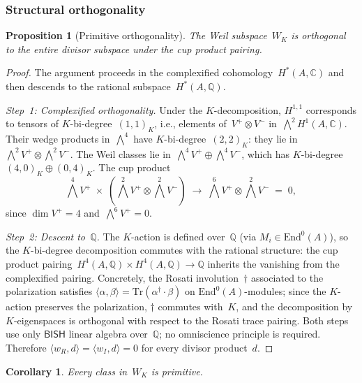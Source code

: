 \documentclass[11pt]{article}
\theoremstyle{plain}
\newtheorem{proposition}[theorem]{Proposition}
\newtheorem{corollary}[theorem]{Corollary}
\theoremstyle{definition}
\theoremstyle{remark}
\newcommand{\Q}{\mathbb{Q}}
\newcommand{\C}{\mathbb{C}}
\newcommand{\End}{\mathrm{End}}
\newcommand{\Tr}{\mathrm{Tr}}
\newcommand{\BISH}{\mathsf{BISH}}
\begin{document}
\subsubsection{Structural orthogonality}

\begin{proposition}[Primitive orthogonality]
\label{prop:orthogonal}
The Weil subspace~$W_K$ is orthogonal to the entire divisor subspace
under the cup product pairing.
\end{proposition}

\begin{proof}
The argument proceeds in the complexified cohomology~$H^*(A,\C)$ and then
descends to the rational subspace~$H^*(A,\Q)$.

\emph{Step~1: Complexified orthogonality.}
Under the $K$-decomposition, $H^{1,1}$ corresponds to tensors of
$K$-bi-degree~$(1,1)_K$, i.e., elements of~$V^+ \otimes V^-$
in~$\bigwedge^2 H^1(A,\C)$.  Their wedge products in~$\bigwedge^4$ have
$K$-bi-degree~$(2,2)_K$: they lie in
$\bigwedge^2 V^+ \otimes \bigwedge^2 V^-$.
The Weil classes lie in~$\bigwedge^4 V^+ \oplus \bigwedge^4 V^-$, which
has $K$-bi-degree~$(4,0)_K \oplus (0,4)_K$.  The cup product
\[
  \textstyle\bigwedge^4 V^+ \;\times\;
  (\textstyle\bigwedge^2 V^+ \otimes \textstyle\bigwedge^2 V^-)
  \;\to\; \textstyle\bigwedge^6 V^+ \otimes \textstyle\bigwedge^2 V^-
  \;=\; 0,
\]
since $\dim V^+ = 4$ and~$\bigwedge^6 V^+ = 0$.

\emph{Step~2: Descent to~$\Q$.}
The $K$-action is defined over~$\Q$ (via $M_i \in \End^0(A)$), so the
$K$-bi-degree decomposition commutes with the rational structure: the
cup product pairing~$H^4(A,\Q) \times H^4(A,\Q) \to \Q$ inherits the
vanishing from the complexified pairing.  Concretely, the Rosati
involution~$\dagger$ associated to the polarization satisfies
$\langle \alpha, \beta \rangle = \Tr(\alpha^\dagger \cdot \beta)$ on
$\End^0(A)$-modules; since the $K$-action preserves the polarization,
$\dagger$ commutes with~$K$, and the decomposition by $K$-eigenspaces
is orthogonal with respect to the Rosati trace pairing.  Both steps use
only $\BISH$ linear algebra over~$\Q$; no omniscience principle is required.
Therefore $\langle w_R, d \rangle = \langle w_I, d \rangle = 0$ for every
divisor product~$d$.
\end{proof}

\begin{corollary}
\label{cor:primitive}
Every class in~$W_K$ is primitive.
\end{corollary}
\end{document}
